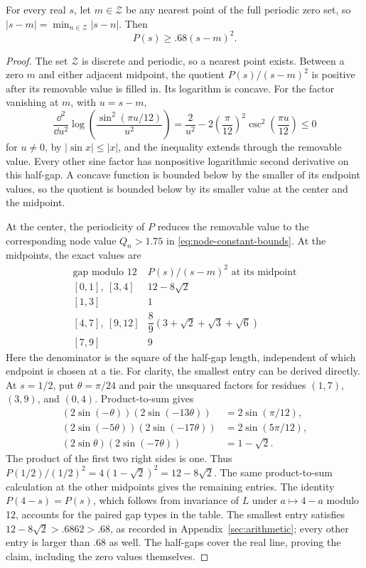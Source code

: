 \begin{lemma}
\label{lem:sine-product-barrier}
For every real \(s\), let \(m\in\mathcal Z\) be any nearest point of the full
periodic zero set, so \(|s-m|=\min_{n\in\mathcal Z}|s-n|\).  Then
\begin{equation}\label{eq:P-quadratic-lower}
 P(s)\ge .68(s-m)^2.
\end{equation}
\end{lemma}

\begin{proof}
The set \(\mathcal Z\) is discrete and periodic, so a nearest point exists.
Between a zero \(m\) and either adjacent midpoint, the quotient
\(P(s)/(s-m)^2\) is positive after its removable value is filled in.  Its
logarithm is concave.  For the factor vanishing at \(m\), with \(u=s-m\),
\[
 \frac{\dd^2}{\dd u^2}
 \log\left(\frac{\sin^2(\pi u/12)}{u^2}\right)
 =\frac2{u^2}-2\left(\frac\pi{12}\right)^2
                \csc^2\left(\frac{\pi u}{12}\right)\le0
\]
for \(u\ne0\), by \(|\sin x|\le|x|\), and the inequality extends through
the removable value.  Every other sine factor has nonpositive logarithmic
second derivative on this half-gap.  A concave function is bounded below by
the smaller of its endpoint values, so the quotient is bounded below by its
smaller value at the center and the midpoint.

At the center, the periodicity of \(P\) reduces the removable value to the
corresponding node value \(Q_n>1.75\) in \eqref{eq:node-constant-bounds}.  At
the midpoints, the exact values are
\[
\begin{array}{c|c}
 \text{gap modulo }12&P(s)/(s-m)^2\text{ at its midpoint}\\ \hline
 {[0,1],\ [3,4]}&12-8\sqrt2\\
 {[1,3]}&1\\
 {[4,7],\ [9,12]}&\dfrac89(3+\sqrt2+\sqrt3+\sqrt6)\\
 {[7,9]}&9
\end{array}
\]
Here the denominator is the square of the half-gap length, independent of
which endpoint is chosen at a tie.  For clarity, the smallest entry can be
derived directly.  At \(s=1/2\), put \(\theta=\pi/24\) and pair the unsquared
factors for residues \((1,7)\), \((3,9)\), and \((0,4)\).  Product-to-sum
gives
\begin{align*}
 (2\sin(-\theta))(2\sin(-13\theta))&=2\sin(\pi/12),\\
 (2\sin(-5\theta))(2\sin(-17\theta))&=2\sin(5\pi/12),\\
 (2\sin\theta)(2\sin(-7\theta))&=1-\sqrt2.
\end{align*}
The product of the first two right sides is one.  Thus
\(P(1/2)/(1/2)^2=4(1-\sqrt2)^2=12-8\sqrt2\).  The same product-to-sum
calculation at the other midpoints gives the remaining entries.  The identity
\(P(4-s)=P(s)\), which follows from invariance of \(L\) under
\(a\mapsto4-a\) modulo 12, accounts for the paired gap types in the table.
The smallest entry satisfies \(12-8\sqrt2>.6862>.68\), as recorded in
Appendix~\ref{sec:arithmetic}; every other entry is larger than \(.68\) as
well.  The half-gaps cover the real line, proving the claim, including the
zero values themselves.
\end{proof}

